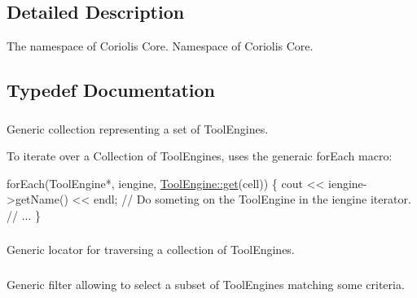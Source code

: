 \subsection{Detailed Description}
The namespace of Coriolis Core. Namespace of Coriolis Core. 

\subsection{Typedef Documentation}
\hypertarget{namespaceCRL_ae49bc0c5f113bba964680768556dd1b3}{
\subsubsection[{Tool\-Engines}]{}}\label{namespaceCRL_ae49bc0c5f113bba964680768556dd1b3}
Generic collection representing a set of Tool\-Engines.

To iterate over a Collection of Tool\-Engines, uses the generaic {\ttfamily for\-Each} macro\-: 
\begin{DoxyCode}
forEach(ToolEngine*, iengine, \hyperlink{classCRL_1_1ToolEngine_afb78e8f180ecc36ff8fa4e91e7885d37}{ToolEngine::get}(cell)) \{
  cout << iengine->getName() << endl;
  \textcolor{comment}{// Do someting on the ToolEngine in the iengine iterator.}
  \textcolor{comment}{// ...}
\}
\end{DoxyCode}
 \hypertarget{namespaceCRL_a9c6426dc361a7b02fc55b7c19401c7aa}{
\subsubsection[{Tool\-Engine\-Locator}]{}}\label{namespaceCRL_a9c6426dc361a7b02fc55b7c19401c7aa}
Generic locator for traversing a collection of Tool\-Engines. \hypertarget{namespaceCRL_a976ed6ed06b1c3510c696de4c8960971}{
\subsubsection[{Tool\-Engine\-Filter}]{}}\label{namespaceCRL_a976ed6ed06b1c3510c696de4c8960971}
Generic filter allowing to select a subset of Tool\-Engines matching some criteria. 